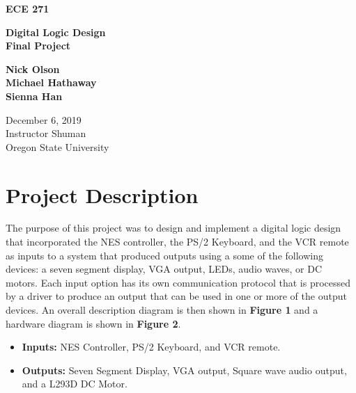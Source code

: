 \documentclass[a4paper]{article}
\begin{document}
\begin{titlepage}
 \begin{center}
  \vspace*{3cm}

  \large\textbf{ECE 271}

  \vspace{2cm}

  \huge\textbf{Digital Logic Design\\Final Project}

  \vspace{.5cm}

  \large\textbf{Nick Olson\\Michael Hathaway\\Sienna Han}

  \vfill

  \normalsize December 6, 2019\\
  Instructor Shuman\\
  Oregon State University

  \vspace{0.8cm}
 \end{center}
\end{titlepage}



\tableofcontents
\listoffigures



\clearpage



\section{Project Description}
The purpose of this project was to design and implement a digital logic design that incorporated the NES controller, the PS/2 Keyboard, and the VCR remote as inputs to a system that produced outputs using a some of the following devices: a seven segment display, VGA output, LEDs, audio waves, or DC motors. Each input option has its own communication protocol that is processed by a driver to produce an output that can be used in one or more of the output devices. An overall description diagram is then shown in \textbf{Figure 1} and a hardware diagram is shown in \textbf{Figure 2}.

\begin{itemize}
  \item \textbf{Inputs:  } NES Controller, PS/2 Keyboard, and VCR remote.
  \item \textbf{Outputs: } Seven Segment Display, VGA output, Square wave audio output, and a L293D DC Motor.
\end{itemize}
\end{document}

